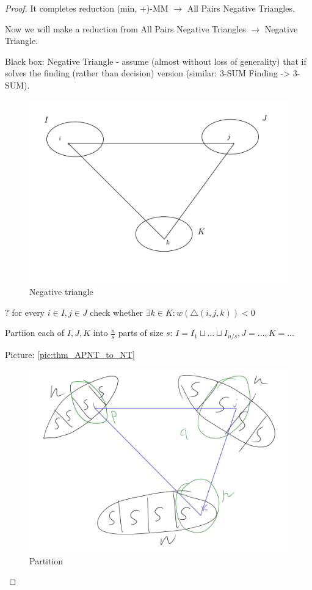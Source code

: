 \begin{proof}
	It completes reduction (min, +)-MM $\to$ All Pairs Negative Triangles.

	Now we will make a reduction from All Pairs Negative Triangles $\to$ Negative Triangle.

	Black box: Negative Triangle - assume (almost without loss of generality) that if solves the finding (rather than decision) version (similar: 3-SUM Finding -> 3-SUM).

	\begin{figure}[ht]
		\centering
		\includegraphics[scale=0.3]{figures/11.pdf}
		\caption{Negative triangle}
	\end{figure}

	? for every $i \in I, j \in J$ check whether $\exists k \in K : w(\triangle(i, j, k)) < 0$




	Partiion each of $I, J, K$ into $\frac{n}{s}$ parts of size $s$: $I = I_1 \sqcup \dots \sqcup I_{n / s}, J = \dots, K = \dots$

	Picture: \eqref{pic:thm_APNT_to_NT}

	\begin{figure}[ht]
		\centering
		\includegraphics[scale=0.3]{figures/12.pdf}
		\caption{Partition}
		\label{pic:thm_APNT_to_NT}
	\end{figure}


\end{proof}

